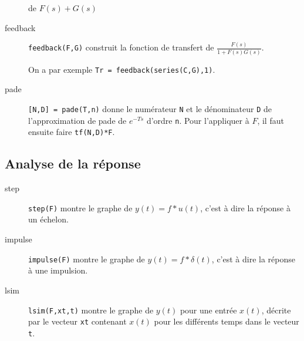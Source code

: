 \begin{description}
    de $F(s) + G(s)$
    \begin{center}
    \end{center}
  \item[feedback] \lstinline|feedback(F,G)| construit la fonction de transfert
    de $\frac{F(s)}{1+F(s)G(s)}$.
    \begin{center}
    \end{center}
    On a par exemple \lstinline|Tr = feedback(series(C,G),1)|.
  \item[pade] \lstinline|[N,D] = pade(T,n)| donne le numérateur \lstinline|N|
    et le dénominateur \lstinline|D| de l'approximation de pade de $e^{-Ts}$ d'ordre
    \lstinline|n|.
    Pour l'appliquer à $F$, il faut ensuite faire \lstinline|tf(N,D)*F|.
\end{description}

\subsection{Analyse de la réponse}
\begin{description}
  \item[step] \lstinline|step(F)| montre le graphe de $y(t) = f * u(t)$,
    c'est à dire la réponse à un échelon.
  \item[impulse] \lstinline|impulse(F)| montre le graphe de $y(t) = f * \delta(t)$,
    c'est à dire la réponse à une impulsion.
  \item[lsim] \lstinline|lsim(F,xt,t)| montre le graphe de $y(t)$ pour une entrée $x(t)$,
    décrite par le vecteur \lstinline|xt| contenant $x(t)$ pour les différents
    temps dans le vecteur \lstinline|t|.
\end{description}

